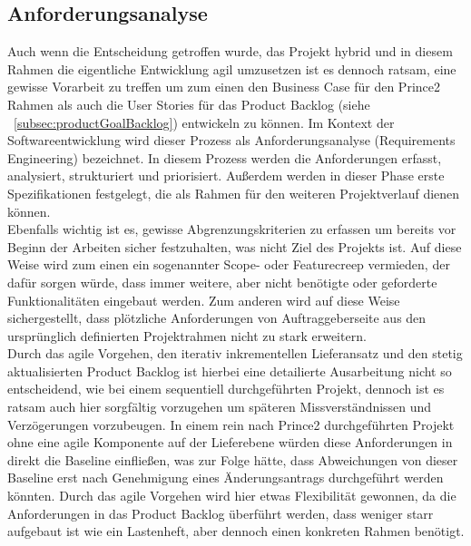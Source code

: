 \subsection{Anforderungsanalyse}
\label{subsec:anforderungsanalyse}

Auch wenn die Entscheidung getroffen wurde, das Projekt hybrid und in diesem Rahmen die eigentliche Entwicklung agil umzusetzen ist es dennoch ratsam, eine gewisse Vorarbeit zu treffen um zum einen den Business Case für den Prince2 Rahmen als auch die User Stories für das Product Backlog (siehe ~\ref{subsec:productGoalBacklog}) entwickeln zu können. Im Kontext der Softwareentwicklung wird dieser Prozess als Anforderungsanalyse (Requirements Engineering) bezeichnet. In diesem Prozess werden die Anforderungen erfasst, analysiert, strukturiert und priorisiert. Außerdem werden in dieser Phase erste Spezifikationen festgelegt, die als Rahmen für den weiteren Projektverlauf dienen können.\\

Ebenfalls wichtig ist es, gewisse Abgrenzungskriterien zu erfassen um bereits vor Beginn der Arbeiten sicher festzuhalten, was nicht Ziel des Projekts ist. Auf diese Weise wird zum einen ein sogenannter Scope- oder Featurecreep vermieden, der dafür sorgen würde, dass immer weitere, aber nicht benötigte oder geforderte Funktionalitäten eingebaut werden. Zum anderen wird auf diese Weise sichergestellt, dass plötzliche Anforderungen von Auftraggeberseite aus den ursprünglich definierten Projektrahmen nicht zu stark erweitern.\\

Durch das agile Vorgehen, den iterativ inkrementellen Lieferansatz und den stetig aktualisierten Product Backlog ist hierbei eine detailierte Ausarbeitung nicht so entscheidend, wie bei einem sequentiell durchgeführten Projekt, dennoch ist es ratsam auch hier sorgfältig vorzugehen um späteren Missverständnissen und Verzögerungen vorzubeugen. In einem rein nach Prince2 durchgeführten Projekt ohne eine agile Komponente auf der Lieferebene würden diese Anforderungen in direkt die Baseline einfließen, was zur Folge hätte, dass Abweichungen von dieser Baseline erst nach Genehmigung eines Änderungsantrags durchgeführt werden könnten. Durch das agile Vorgehen wird hier etwas Flexibilität gewonnen, da die Anforderungen in das Product Backlog überführt werden, dass weniger starr aufgebaut ist wie ein Lastenheft, aber dennoch einen konkreten Rahmen benötigt.\\

